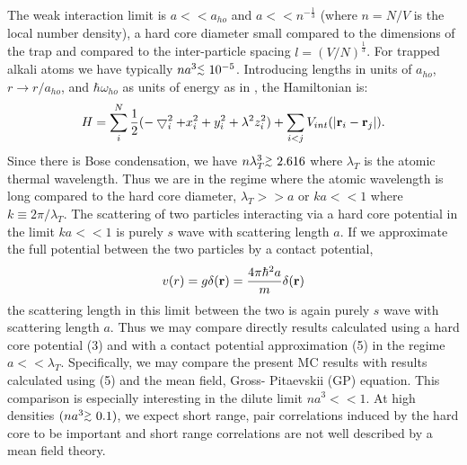 \documentclass[aps,pra,twocolumn,groupedaddress]{revtex4}
\def\gapx{\lower 2pt \hbox{$\buildrel>\over{\scriptstyle{\sim}}$\ }}
\def\lapx{\lower 2pt \hbox{$\buildrel<\over{\scriptstyle{\sim}}$\ }}
\begin{document}
The weak interaction limit is $a << a_{ho}$
and $a << n^{-\frac{1}{3}}$ (where $n=N/V$ is the local number density), 
a hard core diameter small compared to
the dimensions of the trap and compared to the inter-particle spacing
$l=(V/N)^{\frac{1}{3}}$.  
For trapped alkali atoms we have typically $na^3 \lapx 10^{-5}$.  
Introducing lengths in units of $a_{ho}$, $r \rightarrow r/a_{ho}$, 
and $\hbar\omega_{ho}$ as units of energy as in \cite{dalfovo99},  
the Hamiltonian is:
\begin{equation}
H = \sum_i^N\frac{1}{2}(-\bigtriangledown _{i}^2 + x_i^2+y_i^2 + \lambda^2 z_i^2) +
    \sum_{i<j} V_{int}(|{\bf r}_i-{\bf r}_j|).
\end{equation}
Since there 
is Bose condensation, we have $n\lambda^{3}_T \gapx 2.616$ where $\lambda_T$
is the atomic thermal wavelength.  Thus we are in the regime where the atomic
wavelength is long compared to the hard core diameter, $\lambda_T >> a$ or
$ka << 1$ where $k \equiv 2\pi/\lambda_T$.
The scattering of two particles interacting via a hard core potential in the
limit $ka << 1$ is purely $s$ wave with scattering length $a$.  If we
approximate the full potential between the two particles by a contact 
potential,
\begin{equation}
v(r) = g\delta({\bf r}) = \frac{4\pi\hbar^2 a}{m}\delta({\bf r})
\end{equation}
the scattering length in this limit between the two is again purely $s$ wave
with scattering length $a$.  Thus we may compare directly results calculated
using a hard core potential (3) and with a contact potential approximation (5)
in the regime $a << \lambda_T$.  Specifically, we may compare the present MC
results with results calculated using (5) and the mean field, Gross-
Pitaevskii (GP) equation.  This comparison is especially interesting in the
dilute limit $na^3 <<1$.  At high densities $(na^3 \gapx 0.1)$, we expect
short range, pair correlations induced by the hard core to be important and
short range correlations are not well described by a mean field theory.
\end{document}
